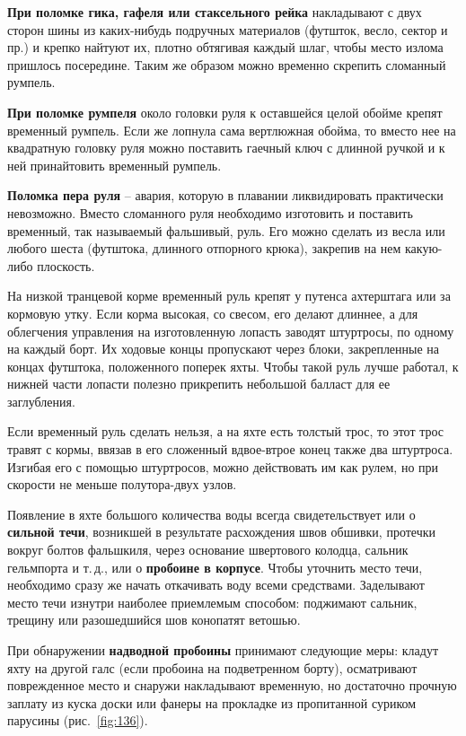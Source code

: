 \documentclass[a4paper, 12pt, twoside, final]{scrbook}
\begin{document}
\textbf{При поломке гика, гафеля или стаксельного рейка} накладывают с двух сторон шины из каких-нибудь подручных материалов (футшток, весло, сектор и пр.) и крепко найтуют их, плотно обтягивая каждый шлаг, чтобы место излома пришлось посередине. Таким же образом можно временно скрепить сломанный румпель.

\textbf{При поломке румпеля} около головки руля к оставшейся целой обойме крепят временный румпель. Если же лопнула сама вертлюжная обойма, то вместо нее на квадратную головку руля можно поставить гаечный ключ с длинной ручкой и к ней принайтовить временный румпель.

\textbf{Поломка пера руля} \--- авария, которую в плавании ликвидировать практически невозможно. Вместо сломанного руля необходимо изготовить и поставить временный, так называемый фальшивый, руль. Его можно сделать из весла или любого шеста (футштока, длинного отпорного крюка), закрепив на нем какую-либо плоскость.

На низкой транцевой корме временный руль крепят у путенса ахтерштага или за кормовую утку. Если корма высокая, со свесом, его делают длиннее, а для облегчения управления на изготовленную лопасть заводят штуртросы, по одному на каждый борт. Их ходовые концы пропускают через блоки, закрепленные на концах футштока, положенного поперек яхты. Чтобы такой руль лучше работал, к нижней части лопасти полезно прикрепить небольшой балласт для ее заглубления.

Если временный руль сделать нельзя, а на яхте есть толстый трос, то этот трос травят с кормы, ввязав в его сложенный вдвое-втрое конец также два штуртроса. Изгибая его с помощью штуртросов, можно действовать им как рулем, но при скорости не меньше полутора-двух узлов.

Появление в яхте большого количества воды всегда свидетельствует или о \textbf{сильной течи}, возникшей в результате расхождения швов обшивки, протечки вокруг болтов фальшкиля, через основание швертового колодца, сальник гельмпорта и т.\,д., или о \textbf{пробоине в корпусе}. Чтобы уточнить место течи, необходимо сразу же начать откачивать воду всеми средствами. Заделывают место течи изнутри наиболее приемлемым способом: поджимают сальник, трещину или разошедшийся шов конопатят ветошью.

При обнаружении \textbf{надводной пробоины} принимают следующие меры: кладут яхту на другой галс (если пробоина на подветренном борту), осматривают поврежденное место и снаружи накладывают временную, но достаточно прочную заплату из куска доски или фанеры на прокладке из пропитанной суриком парусины (рис.~\ref{fig:136}).
\end{document}
